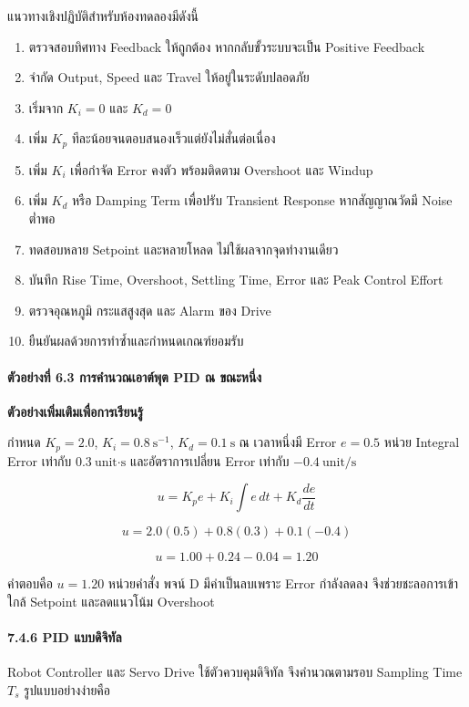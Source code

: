 แนวทางเชิงปฏิบัติสำหรับห้องทดลองมีดังนี้

\begin{enumerate}
    \item ตรวจสอบทิศทาง Feedback ให้ถูกต้อง หากกลับขั้วระบบจะเป็น Positive Feedback
    \item จำกัด Output, Speed และ Travel ให้อยู่ในระดับปลอดภัย
    \item เริ่มจาก $K_i=0$ และ $K_d=0$
    \item เพิ่ม $K_p$ ทีละน้อยจนตอบสนองเร็วแต่ยังไม่สั่นต่อเนื่อง
    \item เพิ่ม $K_i$ เพื่อกำจัด Error คงตัว พร้อมติดตาม Overshoot และ Windup
    \item เพิ่ม $K_d$ หรือ Damping Term เพื่อปรับ Transient Response หากสัญญาณวัดมี Noise ต่ำพอ
    \item ทดสอบหลาย Setpoint และหลายโหลด ไม่ใช้ผลจากจุดทำงานเดียว
    \item บันทึก Rise Time, Overshoot, Settling Time, Error และ Peak Control Effort
    \item ตรวจอุณหภูมิ กระแสสูงสุด และ Alarm ของ Drive
    \item ยืนยันผลด้วยการทำซ้ำและกำหนดเกณฑ์ยอมรับ
\end{enumerate}

\paragraph{ตัวอย่างที่ 6.3 การคำนวณเอาต์พุต PID ณ ขณะหนึ่ง}

\textbf{ตัวอย่างเพิ่มเติมเพื่อการเรียนรู้}

กำหนด $K_p=2.0$, $K_i=0.8\ \text{s}^{-1}$, $K_d=0.1\ \text{s}$ ณ เวลาหนึ่งมี Error $e=0.5$ หน่วย Integral Error เท่ากับ $0.3\ \text{unit·s}$ และอัตราการเปลี่ยน Error เท่ากับ $-0.4\ \text{unit/s}$

\[
u=K_pe+K_i\int e\,dt+K_d\frac{de}{dt}
\]

\[
u=2.0(0.5)+0.8(0.3)+0.1(-0.4)
\]

\[
u=1.00+0.24-0.04=1.20
\]

คำตอบคือ $u=1.20$ หน่วยคำสั่ง พจน์ D มีค่าเป็นลบเพราะ Error กำลังลดลง จึงช่วยชะลอการเข้าใกล้ Setpoint และลดแนวโน้ม Overshoot

\paragraph{7.4.6 PID แบบดิจิทัล}

Robot Controller และ Servo Drive ใช้ตัวควบคุมดิจิทัล จึงคำนวณตามรอบ Sampling Time $T_s$ รูปแบบอย่างง่ายคือ

